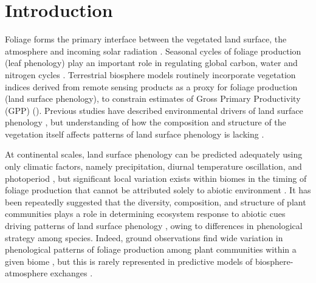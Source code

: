\documentclass[11pt,a4paper]{article}
\begin{document}
\newpage{}

\section{Introduction}

Foliage forms the primary interface between the vegetated land surface, the
atmosphere and incoming solar radiation \citep{Gu2003, Penuelas2009}. Seasonal
cycles of foliage production (leaf phenology) play an important role in
regulating global carbon, water and nitrogen cycles \citep{Richardson2013}.
Terrestrial biosphere models routinely incorporate vegetation indices derived
from remote sensing products as a proxy for foliage production (land surface
phenology), to constrain estimates of Gross Primary Productivity (GPP)
(\citealt{Bloom2016, Helman2018}). Previous studies have described
environmental drivers of land surface phenology \citep{Adole2019, Guan2014},
but understanding of how the composition and structure of the vegetation itself
affects patterns of land surface phenology is lacking \citep{Whitley2017}. 

At continental scales, land surface phenology can be predicted adequately using
only climatic factors, namely precipitation, diurnal temperature oscillation,
and photoperiod \citep{Adole2018a, Adole2019, Guan2014}, but significant local
variation exists within biomes in the timing of foliage production that cannot
be attributed solely to abiotic environment \citep{Stockli2011}. It has been
repeatedly suggested that the diversity, composition, and structure of plant
communities plays a role in determining ecosystem response to abiotic cues
driving patterns of land surface phenology \citep{Adole2018b, Jeganathan2014,
Fuller1999}, owing to differences in phenological strategy among species.
Indeed, ground observations find wide variation in phenological patterns of
foliage production among plant communities within a given biome
\citep{Seyednasrollah2019}, but this is rarely represented in predictive models
of biosphere-atmosphere exchanges \citep{Scheiter2013, Pavlick2013}.
\end{document}
